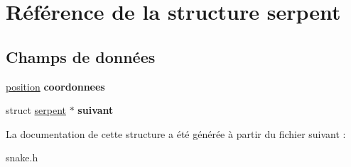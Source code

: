 \hypertarget{structserpent}{\section{Référence de la structure serpent}
\label{structserpent}
}
\subsection*{Champs de données}
\begin{DoxyCompactItemize}
\item 
\hypertarget{structserpent_af443f40fa20dcd8df78e12f66301031a}{\hyperlink{structposition}{position} {\bfseries coordonnees}}\label{structserpent_af443f40fa20dcd8df78e12f66301031a}

\item 
\hypertarget{structserpent_a68a830b195ddf9e590926b84ece77827}{struct \hyperlink{structserpent}{serpent} $\ast$ {\bfseries suivant}}\label{structserpent_a68a830b195ddf9e590926b84ece77827}

\end{DoxyCompactItemize}


La documentation de cette structure a été générée à partir du fichier suivant \-:\begin{DoxyCompactItemize}
\item 
snake.\-h\end{DoxyCompactItemize}
